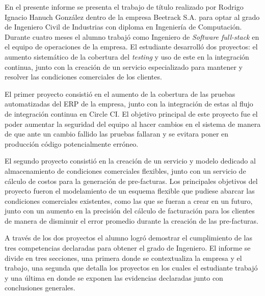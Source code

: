 En el presente informe se presenta el trabajo de título realizado por Rodrigo Ignacio Hanuch González dentro de la empresa Beetrack S.A. para optar al grado de Ingeniero Civil de Industrias con diploma en Ingeniería de Computación. Durante cuatro meses el alumno trabajó como Ingeniero de \textit{Software full-stack} en el equipo de operaciones de la empresa. El estudiante desarrolló dos proyectos: el aumento sistemático de la cobertura del \textit{testing} y uso de este en la integración continua, junto con la creación de un servicio especializado para mantener y resolver las condiciones comerciales de los clientes.

El primer proyecto consistió en el aumento de la cobertura de las pruebas automatizadas del ERP de la empresa, junto con la integración de estas al flujo de integración continua en Circle CI. El objetivo principal de este proyecto fue el poder aumentar la seguridad del equipo al hacer cambios en el sistema de manera de que ante un cambio fallido las pruebas fallaran y se evitara poner en producción código potencialmente erróneo.

El segundo proyecto consistió en la creación de un servicio y modelo dedicado al almacenamiento de condiciones comerciales flexibles, junto con un servicio de cálculo de costos para la generación de pre-facturas. Los principales objetivos del proyecto fueron el modelamiento de un esquema flexible que pudiese abarcar las condiciones comerciales existentes, como las que se fueran a crear en un futuro, junto con un aumento en la precisión del cálculo de facturación para los clientes de manera de disminuir el error promedio durante la creación de las pre-facturas.

A través de los dos proyectos el alumno logró demostrar el cumplimiento de las tres competencias declaradas para obtener el grado de Ingeniero. El informe se divide en tres secciones, una primera donde se contextualiza la empresa y el trabajo, una segunda que detalla los proyectos en los cuales el estudiante trabajó y una última en donde se exponen las evidencias declaradas junto con conclusiones generales.

